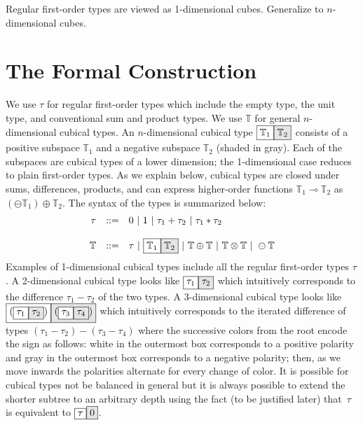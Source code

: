 \documentclass[authoryear,preprint]{sigplanconf}
\newcommand{\lolli}{\multimap}
\newcommand{\cubt}{\mathbb{T}}
\newcommand{\nodet}[2]{\fcolorbox{black}{white}{$#1$}\fcolorbox{black}{gray!20}{$#2$}}
\begin{document}
Regular first-order types are viewed as 1-dimensional cubes. Generalize to
$n$-dimensional cubes. 

\section{The Formal Construction} 

We use $\tau$ for regular first-order types which include the empty type, the
unit type, and conventional sum and product types.  We use $\cubt$ for
general $n$-dimensional cubical types. An $n$-dimensional cubical type
$\nodet{\cubt_1}{\cubt_2}$ consists of a positive subspace $\cubt_1$ and a
negative subspace $\cubt_2$ (shaded in gray). Each of the subspaces are
cubical types of a lower dimension; the 1-dimensional case reduces to plain
first-order types. As we explain below, cubical types are closed under sums,
differences, products, and can express higher-order functions $\cubt_1 \lolli
\cubt_2$ as $(\ominus \cubt_1) \oplus \cubt_2$. The syntax of the types is
summarized below:
\[\begin{array}{rcl}
\tau &::=& 0 \alt 1 \alt \tau_1 + \tau_2 \alt \tau_1 * \tau_2 \\
\\
\cubt &::=& \tau \alt \nodet{\cubt_1}{\cubt_2} 
      \alt \cubt \oplus \cubt 
      \alt \cubt \otimes \cubt 
      \alt \ominus \cubt 
\end{array}\]
Examples of 1-dimensional cubical types include all the regular first-order
types $\tau$. A 2-dimensional cubical type looks like
$\nodet{\tau_1}{\tau_2}$ which intuitively corresponds to the difference
$\tau_1 - \tau_2$ of the two types. A 3-dimensional cubical type looks like
$\nodet{(\nodet{\tau_1}{\tau_2})}{(\nodet{\tau_3}{\tau_4})}$ which
intuitively corresponds to the iterated difference of types
$(\tau_1-\tau_2)-(\tau_3-\tau_4)$ where the successive colors from the root
encode the sign as follows: white in the outermost box corresponds to a
positive polarity and gray in the outermost box corresponds to a negative
polarity; then, as we move inwards the polarities alternate for every change
of color. It is possible for cubical types not be balanced in general but it
is always possible to extend the shorter subtree to an arbitrary depth using
the fact (to be justified later) that~$\tau$ is equivalent to
$\nodet{\tau}{0}$.
\end{document}
